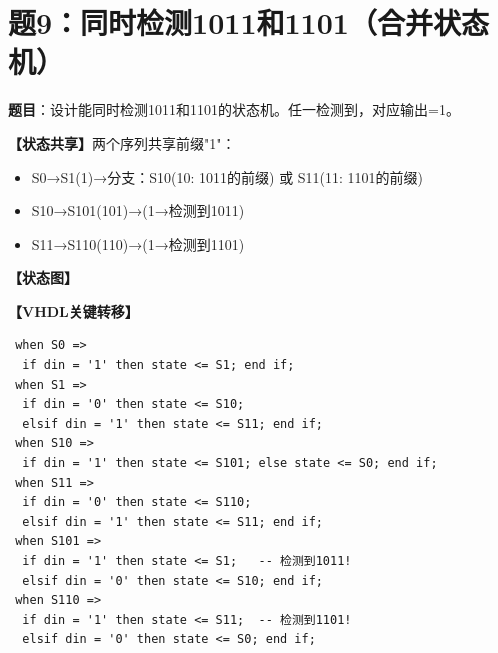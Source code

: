 \section{题9：同时检测1011和1101（合并状态机）}

\textbf{题目}：设计能同时检测1011和1101的状态机。任一检测到，对应输出=1。

\begin{solution}[完整解答]

\textbf{【状态共享】}两个序列共享前缀"1"：
\begin{itemize}
  \item S0→S1(1)→分支：S10(10: 1011的前缀) 或 S11(11: 1101的前缀)
  \item S10→S101(101)→(1→检测到1011)
  \item S11→S110(110)→(1→检测到1101)
\end{itemize}

\textbf{【状态图】}
\begin{center}
\end{center}

\textbf{【VHDL关键转移】}
\begin{lstlisting}
 when S0 =>
  if din = '1' then state <= S1; end if;
 when S1 =>
  if din = '0' then state <= S10;
  elsif din = '1' then state <= S11; end if;
 when S10 =>
  if din = '1' then state <= S101; else state <= S0; end if;
 when S11 =>
  if din = '0' then state <= S110;
  elsif din = '1' then state <= S11; end if;
 when S101 =>
  if din = '1' then state <= S1;   -- 检测到1011!
  elsif din = '0' then state <= S10; end if;
 when S110 =>
  if din = '1' then state <= S11;  -- 检测到1101!
  elsif din = '0' then state <= S0; end if;
\end{lstlisting}

\end{solution}


